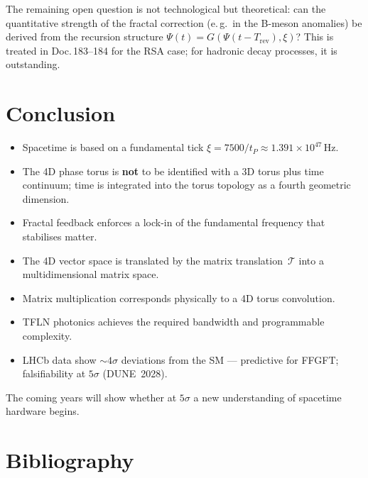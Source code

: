 The remaining open question is not technological but theoretical:
can the quantitative strength of the fractal correction
(e.\,g.\ in the B-meson anomalies) be derived from the recursion
structure $\Psi(t) = G(\Psi(t-T_{\text{rev}}), \xi)$?
This is treated in Doc.\,183--184 for the RSA case;
for hadronic decay processes, it is outstanding.

\section{Conclusion}

\begin{itemize}
  \item Spacetime is based on a fundamental tick
        $\xi = 7500/t_P \approx 1.391 \times 10^{47}\,\text{Hz}$.
  \item The 4D phase torus is \textbf{not} to be identified with a 3D
        torus plus time continuum; time is integrated into the torus
        topology as a fourth geometric dimension.
  \item Fractal feedback enforces a lock-in of the fundamental frequency
        that stabilises matter.
  \item The 4D vector space is translated by the matrix
        translation~$\mathcal{T}$ into a multidimensional matrix space.
  \item Matrix multiplication corresponds physically to a 4D torus
        convolution.
  \item TFLN photonics achieves the required bandwidth and programmable
        complexity.
  \item LHCb data show $\sim 4\sigma$ deviations from the SM —
        predictive for FFGFT; falsifiability at $5\sigma$ (DUNE~2028).
\end{itemize}

\begin{keybox}
The coming years will show whether at $5\sigma$ a new understanding of
spacetime hardware begins.
\end{keybox}

\newpage
\section*{Bibliography}

